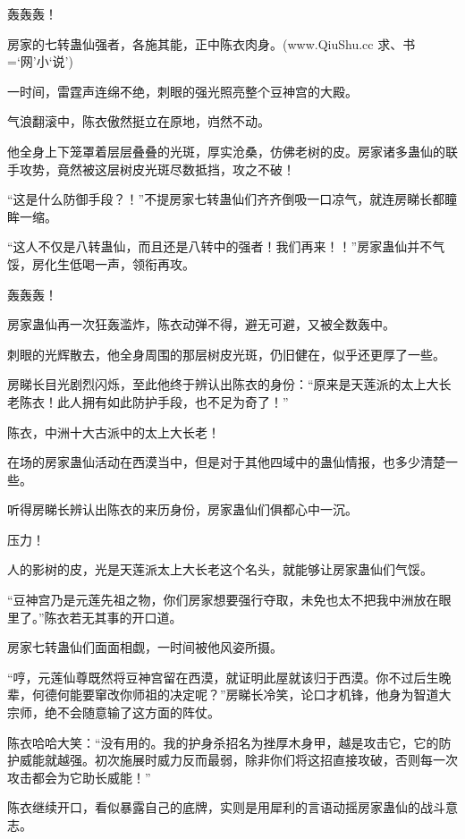 
\begin{this_body}

轰轰轰！

房家的七转蛊仙强者，各施其能，正中陈衣肉身。(www.QiuShu.cc 求、书=‘网’小‘说’)

一时间，雷霆声连绵不绝，刺眼的强光照亮整个豆神宫的大殿。

气浪翻滚中，陈衣傲然挺立在原地，岿然不动。

他全身上下笼罩着层层叠叠的光斑，厚实沧桑，仿佛老树的皮。房家诸多蛊仙的联手攻势，竟然被这层树皮光斑尽数抵挡，攻之不破！

“这是什么防御手段？！”不提房家七转蛊仙们齐齐倒吸一口凉气，就连房睇长都瞳眸一缩。

“这人不仅是八转蛊仙，而且还是八转中的强者！我们再来！！”房家蛊仙并不气馁，房化生低喝一声，领衔再攻。

轰轰轰！

房家蛊仙再一次狂轰滥炸，陈衣动弹不得，避无可避，又被全数轰中。

刺眼的光辉散去，他全身周围的那层树皮光斑，仍旧健在，似乎还更厚了一些。

房睇长目光剧烈闪烁，至此他终于辨认出陈衣的身份：“原来是天莲派的太上大长老陈衣！此人拥有如此防护手段，也不足为奇了！”

陈衣，中洲十大古派中的太上大长老！

在场的房家蛊仙活动在西漠当中，但是对于其他四域中的蛊仙情报，也多少清楚一些。

听得房睇长辨认出陈衣的来历身份，房家蛊仙们俱都心中一沉。

压力！

人的影树的皮，光是天莲派太上大长老这个名头，就能够让房家蛊仙们气馁。

“豆神宫乃是元莲先祖之物，你们房家想要强行夺取，未免也太不把我中洲放在眼里了。”陈衣若无其事的开口道。

房家七转蛊仙们面面相觑，一时间被他风姿所摄。

“哼，元莲仙尊既然将豆神宫留在西漠，就证明此屋就该归于西漠。你不过后生晚辈，何德何能要窜改你师祖的决定呢？”房睇长冷笑，论口才机锋，他身为智道大宗师，绝不会随意输了这方面的阵仗。

陈衣哈哈大笑：“没有用的。我的护身杀招名为挫厚木身甲，越是攻击它，它的防护威能就越强。初次施展时威力反而最弱，除非你们将这招直接攻破，否则每一次攻击都会为它助长威能！”

陈衣继续开口，看似暴露自己的底牌，实则是用犀利的言语动摇房家蛊仙的战斗意志。


\end{this_body}

